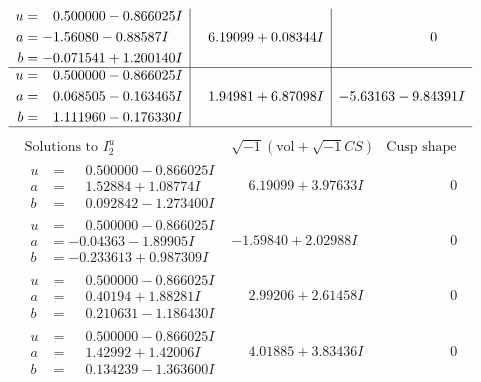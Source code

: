 \documentclass[1p]{elsarticle_modified}
\theoremstyle{definition}
\newcommand{\I}{\sqrt{-1}}
\begin{document}
$$\begin{array}{c|c|c}
\begin{aligned}
u &= \phantom{-}0.500000 - 0.866025 I \\
a &= -1.56080 - 0.88587 I \\
b &= -0.071541 + 1.200140 I\end{aligned}
 & \phantom{-}6.19099 + 0.08344 I & \phantom{-0.000000 } 0 \\ \hline\begin{aligned}
u &= \phantom{-}0.500000 - 0.866025 I \\
a &= \phantom{-}0.068505 - 0.163465 I \\
b &= \phantom{-}1.111960 - 0.176330 I\end{aligned}
 & \phantom{-}1.94981 + 6.87098 I & -5.63163 - 9.84391 I\\
 \hline 
 \end{array}$$\newpage$$\begin{array}{c|c|c}  
\text{Solutions to }I^u_{2}& \I (\text{vol} + \sqrt{-1}CS) & \text{Cusp shape}\\
 \hline 
\begin{aligned}
u &= \phantom{-}0.500000 - 0.866025 I \\
a &= \phantom{-}1.52884 + 1.08774 I \\
b &= \phantom{-}0.092842 - 1.273400 I\end{aligned}
 & \phantom{-}6.19099 + 3.97633 I & \phantom{-0.000000 } 0 \\ \hline\begin{aligned}
u &= \phantom{-}0.500000 - 0.866025 I \\
a &= -0.04363 - 1.89905 I \\
b &= -0.233613 + 0.987309 I\end{aligned}
 & -1.59840 + 2.02988 I & \phantom{-0.000000 } 0 \\ \hline\begin{aligned}
u &= \phantom{-}0.500000 - 0.866025 I \\
a &= \phantom{-}0.40194 + 1.88281 I \\
b &= \phantom{-}0.210631 - 1.186430 I\end{aligned}
 & \phantom{-}2.99206 + 2.61458 I & \phantom{-0.000000 } 0 \\ \hline\begin{aligned}
u &= \phantom{-}0.500000 - 0.866025 I \\
a &= \phantom{-}1.42992 + 1.42006 I \\
b &= \phantom{-}0.134239 - 1.363600 I\end{aligned}
 & \phantom{-}4.01885 + 3.83436 I & \phantom{-0.000000 } 0 \\ \hline\begin{aligned}

\end{aligned}
\end{array}$$
\end{document}
